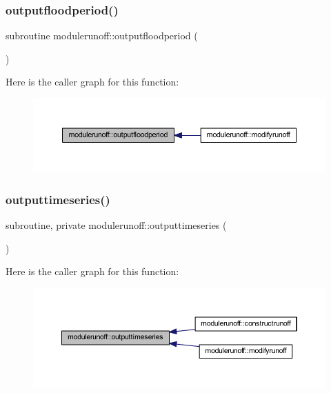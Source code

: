 \subsubsection{\texorpdfstring{outputfloodperiod()}{outputfloodperiod()}}
{\footnotesize\ttfamily subroutine modulerunoff\+::outputfloodperiod (\begin{DoxyParamCaption}{ }\end{DoxyParamCaption})\hspace{0.3cm}{\ttfamily [private]}}

Here is the caller graph for this function\+:\nopagebreak
\begin{figure}[H]
\begin{center}
\leavevmode
\includegraphics[width=350pt]{namespacemodulerunoff_ad52912e124d2d30970fdc6d5bd8c15cc_icgraph}
\end{center}
\end{figure}
\mbox{\label{namespacemodulerunoff_aaf5ac22ae6531f74c06c4596a878eaf9}} 
\subsubsection{\texorpdfstring{outputtimeseries()}{outputtimeseries()}}
{\footnotesize\ttfamily subroutine, private modulerunoff\+::outputtimeseries (\begin{DoxyParamCaption}{ }\end{DoxyParamCaption})\hspace{0.3cm}{\ttfamily [private]}}

Here is the caller graph for this function\+:\nopagebreak
\begin{figure}[H]
\begin{center}
\leavevmode
\includegraphics[width=350pt]{namespacemodulerunoff_aaf5ac22ae6531f74c06c4596a878eaf9_icgraph}
\end{center}
\end{figure}
\mbox{\label{namespacemodulerunoff_a5181922fc72d5c17acb9fdf3127d6318}} 

